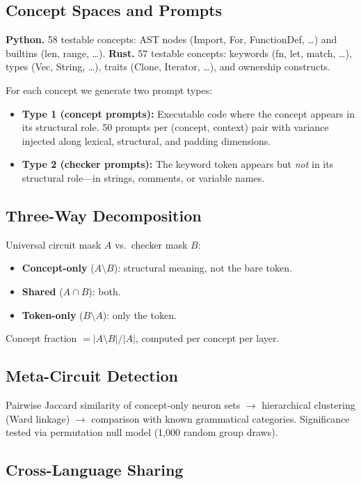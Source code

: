 \documentclass[11pt]{article}
\begin{document}
\subsection{Concept Spaces and Prompts}

\textbf{Python.} 58 testable concepts: AST nodes (Import, For, FunctionDef, \ldots) and builtins (len, range, \ldots). \textbf{Rust.} 57 testable concepts: keywords (fn, let, match, \ldots), types (Vec, String, \ldots), traits (Clone, Iterator, \ldots), and ownership constructs.

For each concept we generate two prompt types:
\begin{itemize}
    \item \textbf{Type 1 (concept prompts):} Executable code where the concept appears in its structural role. 50 prompts per (concept, context) pair with variance injected along lexical, structural, and padding dimensions.
    \item \textbf{Type 2 (checker prompts):} The keyword token appears but \textit{not} in its structural role---in strings, comments, or variable names.
\end{itemize}

\subsection{Three-Way Decomposition}

Universal circuit mask $A$ vs.\ checker mask $B$:
\begin{itemize}
    \item \textbf{Concept-only} ($A \setminus B$): structural meaning, not the bare token.
    \item \textbf{Shared} ($A \cap B$): both.
    \item \textbf{Token-only} ($B \setminus A$): only the token.
\end{itemize}
Concept fraction $= |A \setminus B| / |A|$, computed per concept per layer.

\subsection{Meta-Circuit Detection}

Pairwise Jaccard similarity of concept-only neuron sets $\rightarrow$ hierarchical clustering (Ward linkage) $\rightarrow$ comparison with known grammatical categories. Significance tested via permutation null model (1{,}000 random group draws).

\subsection{Cross-Language Sharing}
\end{document}
